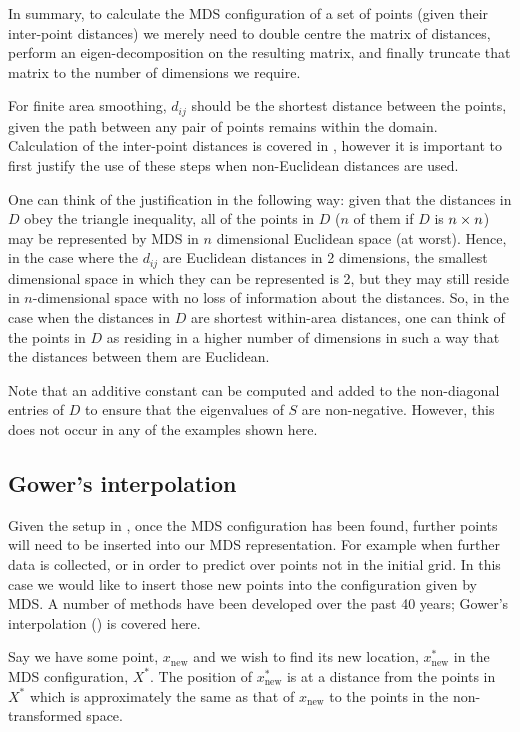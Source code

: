 In summary, to calculate the MDS configuration of a set of points (given their inter-point distances) we merely need to double centre the matrix of distances, perform an eigen-decomposition on the resulting matrix, and finally truncate that matrix to the number of dimensions we require.

For finite area smoothing, $d_{ij}$ should be the shortest distance between the points, given the path between any pair of points remains within the domain. Calculation of the inter-point distances is covered in , however it is important to first justify the use of these steps when non-Euclidean distances are used. 

One can think of the justification in the following way: given that the distances in $D$ obey the triangle inequality, all of the points in $D$ ($n$ of them if $D$ is $n \times n$) may be represented by MDS in $n$ dimensional Euclidean space (at worst). Hence, in the case where the $d_{ij}$ are Euclidean distances in 2 dimensions, the smallest dimensional space in which they can be represented is 2, but they may still reside in $n$-dimensional space with no loss of information about the distances. So, in the case when the distances in $D$ are shortest within-area distances, one can think of the points in $D$ as residing in a higher number of dimensions in such a way that the distances between them are Euclidean.

Note that an additive constant can be computed and added to the non-diagonal entries of $D$ to ensure that the eigenvalues of $S$ are non-negative. However, this does not occur in any of the examples shown here.

\subsection{Gower's interpolation} 
\label{gowers}
Given the setup in , once the MDS configuration has been found, further points will need to be inserted into our MDS representation. For example when further data is collected, or in order to predict over points not in the initial grid. In this case we would like to insert those new points into the configuration given by MDS. A number of methods have been developed over the past 40 years; Gower's interpolation (\cite{gower1968}) is covered here.

Say we have some point, $x_{\text{new}}$ and we wish to find its new location, $x^*_{\text{new}}$ in the MDS configuration, $X^*$. The position of $x^*_{\text{new}}$ is at a distance from the points in $X^*$ which is approximately the same as that of $x_{\text{new}}$ to the points in the non-transformed space. 

